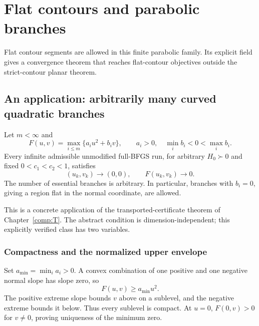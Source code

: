 \chapter{Flat contours and parabolic branches}\label{comp:Q}\label{Q:chapter}
\renewcommand{\ModuleTag}{10}
Flat contour segments are allowed in this finite parabolic family. Its explicit field gives a convergence theorem that reaches flat-contour objectives outside the strict-contour planar theorem.


\begingroup
\providecommand{\R}{}
\renewcommand{\R}{\mathbb R}
\providecommand{\tr}{}
\renewcommand{\tr}{\operatorname{tr}}
\providecommand{\diag}{}
\renewcommand{\diag}{\operatorname{diag}}
\providecommand{\Span}{}
\renewcommand{\Span}{\operatorname{span}}
\providecommand{\ip}{}
\renewcommand{\ip}[2]{\langle #1,#2\rangle}
\providecommand{\norm}{}
\renewcommand{\norm}[1]{\lVert #1\rVert}
\providecommand{\T}{}
\renewcommand{\T}{^{\mathsf T}}
\providecommand{\D}{}
\renewcommand{\D}{\mathcal D}
\setcounter{section}{4}
\setcounter{theorem}{1}
\setcounter{lemma}{0}
\setcounter{corollary}{0}
\setcounter{proposition}{0}
\setcounter{remark}{0}
\setcounter{equation}{6}


\section{An application: arbitrarily many curved quadratic branches}

\begin{theorem}
Let $m<\infty$ and
\[
 F(u,v)=\max_{i\le m}\{a_i u^2+b_i v\},\qquad
 a_i>0,\quad\min_i b_i<0<\max_i b_i.
\]
Every infinite admissible unmodified full-BFGS run, for arbitrary $H_0\succ0$ and fixed $0<c_1<c_2<1$, satisfies
\[
 (u_k,v_k)\to(0,0),\qquad F(u_k,v_k)\to0.
\]
The number of essential branches is arbitrary. In particular, branches with $b_i=0$, giving a region flat in the normal coordinate, are allowed.
\end{theorem}
This is a concrete application of the transported-certificate theorem of Chapter~\ref{comp:T}. The abstract condition is dimension-independent; this explicitly verified class has two variables.



\subsection{Compactness and the normalized upper envelope}
Set $a_{\min}=\min_i a_i>0$. A convex combination of one positive and one negative normal slope has slope zero, so
\[
 F(u,v)\ge a_{\min}u^2.
\]
The positive extreme slope bounds $v$ above on a sublevel, and the negative extreme bounds it below. Thus every sublevel is compact. At $u=0$, $F(0,v)>0$ for $v\ne0$, proving uniqueness of the minimum zero.

